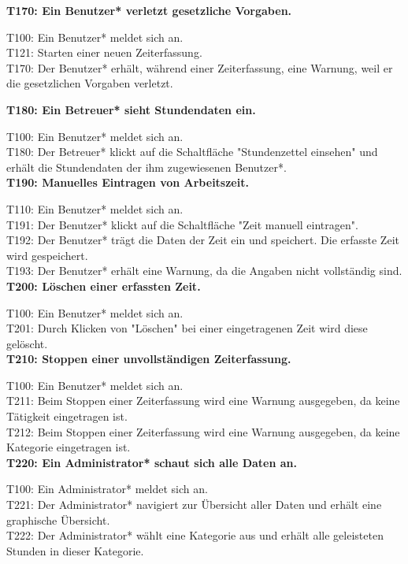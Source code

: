 \textbf{T170: Ein Benutzer* verletzt gesetzliche Vorgaben.}

T100: Ein Benutzer* meldet sich an. \\
T121: Starten einer neuen Zeiterfassung. \\
T170: Der Benutzer* erhält, während einer Zeiterfassung, eine Warnung, weil er die gesetzlichen Vorgaben verletzt. \\

\newpage

\textbf{T180: Ein Betreuer* sieht Stundendaten ein.}

T100: Ein Benutzer* meldet sich an. \\
T180: Der Betreuer* klickt auf die Schaltfläche "Stundenzettel einsehen" und erhält die Stundendaten der ihm zugewiesenen Benutzer*. \\
        
\textbf{T190: Manuelles Eintragen von Arbeitszeit.}

T110: Ein Benutzer* meldet sich an. \\
T191: Der Benutzer* klickt auf die Schaltfläche "Zeit manuell eintragen". \\
T192: Der Benutzer* trägt die Daten der Zeit ein und speichert. Die erfasste Zeit wird gespeichert. \\
T193: Der Benutzer* erhält eine Warnung, da die Angaben nicht vollständig sind. \\

\textbf{T200: Löschen einer erfassten Zeit.}

T100: Ein Benutzer* meldet sich an. \\
T201: Durch Klicken von "Löschen" bei einer eingetragenen Zeit wird diese gelöscht. \\
    
\textbf{T210: Stoppen einer unvollständigen Zeiterfassung.}

T100: Ein Benutzer* meldet sich an. \\
T211: Beim Stoppen einer Zeiterfassung wird eine Warnung ausgegeben, da keine Tätigkeit eingetragen ist. \\
T212: Beim Stoppen einer Zeiterfassung wird eine Warnung ausgegeben, da keine Kategorie eingetragen ist. \\
            
\textbf{T220:  Ein Administrator* schaut sich alle Daten an.}

T100: Ein Administrator* meldet sich an. \\
T221: Der Administrator* navigiert zur Übersicht aller Daten und erhält eine graphische Übersicht. \\
T222: Der Administrator* wählt eine Kategorie aus und erhält alle geleisteten Stunden in dieser Kategorie.

